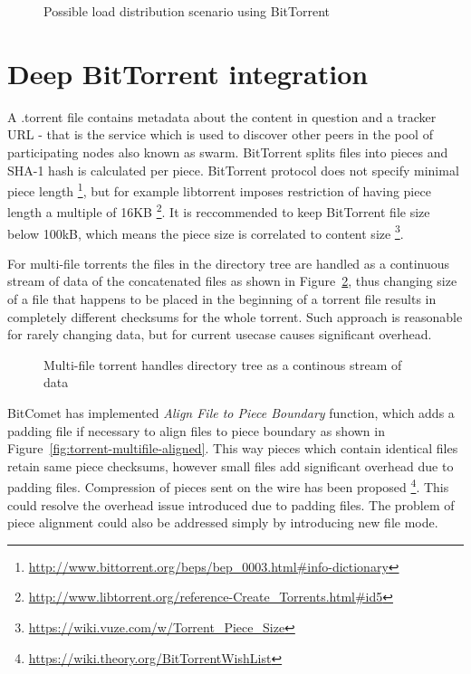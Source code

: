\documentclass[a4paper,11pt]{kth-mag}
\begin{document}
\begin{figure}[!htb]
\centering
\scalebox{0.5}{}
\caption{Possible load distribution scenario using BitTorrent}
\label{fig:butterknife-usecase-bittorrent}
\end{figure}




\section{Deep BitTorrent integration}

A .torrent file contains metadata about the content in question and a
tracker URL - that is the service which is used to discover other peers in the
pool of participating nodes also known as swarm.
BitTorrent splits files into pieces and SHA-1 hash is calculated per piece.
BitTorrent protocol does not specify minimal piece length
\footnote{\url{http://www.bittorrent.org/beps/bep_0003.html\#info-dictionary}},
but for example libtorrent imposes restriction of having piece length
a multiple of 16KB
\footnote{\url{http://www.libtorrent.org/reference-Create_Torrents.html\#id5}}.
It is reccommended to keep BitTorrent file size below 100kB,
which means the piece size is correlated to content size
\footnote{\url{https://wiki.vuze.com/w/Torrent_Piece_Size}}.

For multi-file torrents the files in the directory tree are handled
as a continuous stream of data of the concatenated files
as shown in Figure~\ref{fig:torrent-multifile},
thus changing size of a file that happens to be placed in the beginning of a torrent
file results in completely different checksums for the whole torrent.
Such approach is reasonable for rarely changing data, but for current usecase
causes significant overhead.


\begin{figure}[!htb]
\centering
\scalebox{0.35}{}
\caption{Multi-file torrent handles directory tree as a continous stream of data}
\label{fig:torrent-multifile}
\end{figure}

BitComet has implemented \emph{Align File to Piece Boundary} function,
which adds a padding file if necessary to align files to piece boundary
as shown in Figure~\ref{fig:torrent-multifile-aligned}.
This way pieces which contain identical files retain same piece checksums,
however small files add significant overhead due to padding files.
Compression of pieces sent on the wire has been proposed
\footnote{\url{https://wiki.theory.org/BitTorrentWishList}}.
This could resolve the overhead issue introduced due to padding files.
The problem of piece alignment could also be addressed
simply by introducing new file mode.
\end{document}

